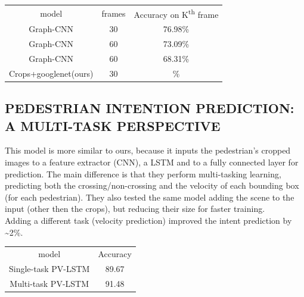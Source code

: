 \documentclass[11pt]{article}
\begin{document}
\begin{center}
\begin{tabular}{| c c c |}\hline
    model & frames & Accuracy on K\textsuperscript{th} frame\\
    Graph-CNN & 30 & 76.98\% \\
    Graph-CNN & 60 & 73.09\% \\
    Graph-CNN & 60 & 68.31\% \\
    Crops+googlenet(ours) & 30 & \% \\\hline

\end{tabular}
\end{center}

\subsection*{PEDESTRIAN INTENTION PREDICTION: A MULTI-TASK PERSPECTIVE}
This model is more similar to ours, because it inputs the pedestrian's cropped images to a feature extractor (CNN), a
LSTM and to a fully connected layer for prediction.
The main difference is that they perform multi-tasking learning, predicting both the crossing/non-crossing and the velocity of
each bounding box (for each pedestrian).
They also tested the same model adding the scene to the input (other then the crops), but reducing their size for faster training.\\
Adding a different task (velocity prediction) improved the intent prediction by \textasciitilde 2\%.

\begin{center}
\begin{tabular}{| c c |}\hline
    model & Accuracy\\

    Single-task PV-LSTM & 89.67\\
    Multi-task PV-LSTM & 91.48\\\hline

\end{tabular}
\end{center}





\end{document}
